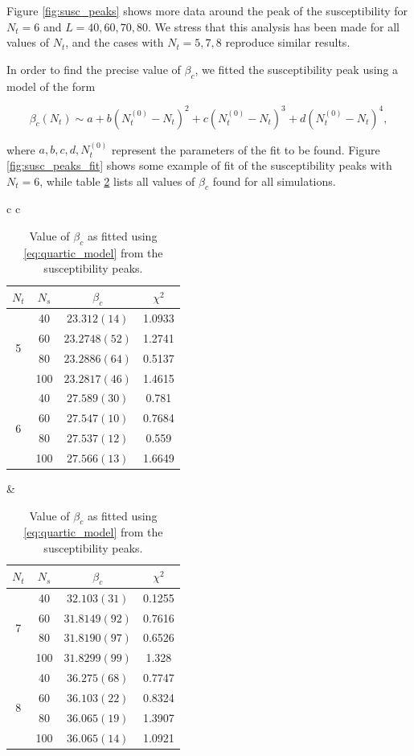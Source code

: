 \documentclass[reqno,12pt]{article}
\numberwithin{equation}{section}
\begin{document}
Figure \ref{fig:susc_peaks} shows more data around the peak of the susceptibility for $N_t = 6$ and
$L = 40, 60, 70, 80$. We stress that this analysis has been made for all values
of $N_t$, and the cases with $N_t = 5, 7, 8$ reproduce similar results.

In order to find the precise value of $\beta_c$, we fitted the susceptibility peak
using a model of the form

\begin{equation} \label{eq:quartic_model}
	\beta_c(N_t) \sim a + b(N_t^{(0)} - N_t)^2 + c(N_t^{(0)} - N_t)^3 + d(N_t^{(0)} - N_t)^4,
\end{equation}

where $a,b,c,d,N_t^{(0)}$ represent the parameters of the fit to be found. Figure \ref{fig:susc_peaks_fit} shows
some example of fit of the susceptibility peaks with $N_t = 6$, while table \ref{table:beta_c} lists all values
of $\beta_c$ found for all simulations.

\begin{table}[h]
\begin{center}
	\begin{tabular}{c c}
		\begin{tabular}{|c|c|c|c|}
			\hline
			$N_t$ & $N_s$ & $\beta_c$ & $\chi^2$ \\
			\hline
			\multirow{4}{*}{5} 
			& 40  & $23.312(14)$   & 1.0933\\
			& 60  & $23.2748(52)$ & 1.2741 \\
			& 80  & $23.2886(64)$ & 0.5137 \\
			& 100 & $23.2817(46)$ & 1.4615 \\
			\hline
			\multirow{4}{*}{6} 
			& 40  & $27.589(30)$  & 0.781 \\
			& 60  & $27.547(10)$  & 0.7684 \\
			& 80  & $27.537(12)$ & 0.559 \\
			& 100 & $27.566(13)$ & 1.6649 \\
			\hline
		\end{tabular}
		&
		\begin{tabular}{|c|c|c|c|}
			\hline
			$N_t$ & $N_s$ & $\beta_c$ & $\chi^2$ \\
			\hline
			\multirow{4}{*}{7} 
			& 40  & $32.103(31) $  & 0.1255 \\
			& 60  & $31.8149(92)$ & 0.7616 \\
			& 80  & $31.8190(97)$  & 0.6526 \\
			& 100 & $31.8299(99)$ & 1.328 \\
			\hline
			\multirow{4}{*}{8} 
			& 40  & $36.275(68)$ & 0.7747 \\
			& 60  & $36.103(22)$ & 0.8324 \\
			& 80  & $36.065(19)$ & 1.3907 \\
			& 100 & $36.065(14)$ & 1.0921 \\
			\hline			
		\end{tabular}
	\end{tabular}
\end{center}
\caption[Fitted $\beta_c$]{Value of $\beta_c$ as fitted using \eqref{eq:quartic_model} from the susceptibility peaks.}
\label{table:beta_c}
\end{table}
\end{document}
